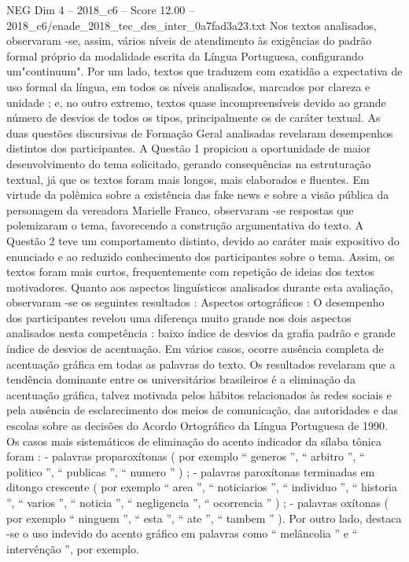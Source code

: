 \begin{textsample}{NEG Dim 4 – 2018\_c6 – Score 12.00 – 2018\_c6/enade\_2018\_tec\_des\_inter\_0a7fad3a23.txt}
Nos textos analisados, observaram -se, assim, vários níveis de atendimento às exigências do padrão formal próprio da modalidade escrita da Língua Portuguesa, configurando um"continuum".
Por um lado, textos que traduzem com exatidão a expectativa de uso formal da língua, em todos os níveis analisados, marcados por clareza e unidade ; e, no outro extremo, textos quase incompreensíveis devido ao grande número de desvios de todos os tipos, principalmente os de caráter textual.
As duas questões discursivas de Formação Geral analisadas revelaram desempenhos distintos dos participantes.
A Questão 1 propiciou a oportunidade de maior desenvolvimento do tema solicitado, gerando consequências na estruturação textual, já que os textos foram mais longos, mais elaborados e fluentes.
Em virtude da polêmica sobre a existência das fake news e sobre a visão pública da personagem da vereadora Marielle Franco, observaram -se respostas que polemizaram o tema, favorecendo a construção argumentativa do texto.
A Questão 2 teve um comportamento distinto, devido ao caráter mais expositivo do enunciado e ao reduzido conhecimento dos participantes sobre o tema.
Assim, os textos foram mais curtos, frequentemente com repetição de ideias dos textos motivadores.
Quanto aos aspectos linguísticos analisados durante esta avaliação, observaram -se os seguintes resultados : Aspectos ortográficos : O desempenho dos participantes revelou uma diferença muito grande nos dois aspectos analisados nesta competência : baixo índice de desvios da grafia padrão e grande índice de desvios de acentuação.
Em vários casos, ocorre ausência completa de acentuação gráfica em todas as palavras do texto.
Os resultados revelaram que a tendência dominante entre os universitários brasileiros é a eliminação da acentuação gráfica, talvez motivada pelos hábitos relacionados às redes sociais e pela ausência de esclarecimento dos meios de comunicação, das autoridades e das escolas sobre as decisões do Acordo Ortográfico da Língua Portuguesa de 1990.
Os casos mais sistemáticos de eliminação do acento indicador da sílaba tônica foram : - palavras proparoxítonas ( por exemplo “ generos ”, “ arbitro ”, “ politico ”, “ publicas ”, “ numero ” ) ; - palavras paroxítonas terminadas em ditongo crescente ( por exemplo “ area ”, “ noticiarios ”, “ individuo ”, “ historia ”, “ varios ”, “ noticia ”, “ negligencia ”, “ ocorrencia ” ) ; - palavras oxítonas ( por exemplo “ ninguem ”, “ esta ”, “ ate ”, “ tambem ” ).
Por outro lado, destaca -se o uso indevido do acento gráfico em palavras como “ melâncolia ” e “ intervênção ”, por exemplo.

\end{textsample}
